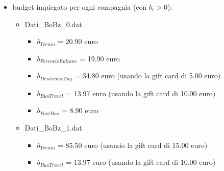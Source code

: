 \documentclass[main.tex]{subfiles}
\begin{document}
\begin{itemize}
\begin{itemize}
    \end{itemize}
    \item budget impiegato per ogni compagnia (con $b_t > 0$):
    \begin{itemize}
        \item Dati\_BoBz\_0.dat
        \begin{itemize}
            \item $b_{Trenia}$ = 20.90 euro
            \item $b_{FerrovieItaliane}$ = 19.90 euro
            \item $b_{DeutscherZug}$ = 34.80 euro (usando la gift card di 5.00 euro)
            \item $b_{BusTravel}$ = 13.97 euro (usando la gift card di 10.00 euro)
            \item $b_{FastBus}$ = 8.90 euro
        \end{itemize}
        \item Dati\_BoBz\_1.dat
        \begin{itemize}
            \item $b_{Trenia}$ = 85.50 euro (usando la gift card di 15.00 euro)
            \item $b_{BusTravel}$ = 13.97 euro (usando la gift card di 10.00 euro)
        \end{itemize}
    \end{itemize}
\end{itemize}
\end{document}
